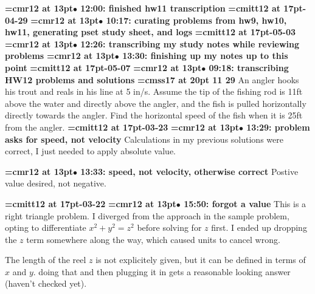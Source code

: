 {\smallskip\noindent\bf\font\titlefont=cmr12 at 13pt\titlefont $\bullet$ 12:00: finished hw11 transcription}\smallskip
{\medskip\noindent\bf\font\titlefont=cmitt12 at 17pt-04-29}\medskip
{\smallskip\noindent\bf\font\titlefont=cmr12 at 13pt\titlefont $\bullet$ 10:17: curating problems from hw9, hw10, hw11, generating pset study sheet, and logs}\smallskip
{\medskip\noindent\bf\font\titlefont=cmitt12 at 17pt-05-03}\medskip
{\smallskip\noindent\bf\font\titlefont=cmr12 at 13pt\titlefont $\bullet$ 12:26: transcribing my study notes while reviewing problems}\smallskip
{\smallskip\noindent\bf\font\titlefont=cmr12 at 13pt\titlefont $\bullet$ 13:30: finishing up my notes up to this point}\smallskip
{\medskip\noindent\bf\font\titlefont=cmitt12 at 17pt-05-07}\medskip
{\smallskip\noindent\bf\font\titlefont=cmr12 at 13pt\titlefont $\bullet$ 09:18: transcribing HW12 problems and solutions}\smallskip
{}
{\medskip\noindent\bf\font\titlefont=cmss17 at 20pt 11 29}\medskip
An angler hooks his trout and reals in his line at 5 in/s.
Assume the tip of the fishing rod is 11ft above the water
and directly above the angler, and the fish is pulled horizontally
directly towards the angler. Find the horizontal speed of the fish
when it is 25ft from the angler.
{\medskip\noindent\bf\font\titlefont=cmitt12 at 17pt-03-23}\medskip
{\smallskip\noindent\bf\font\titlefont=cmr12 at 13pt\titlefont $\bullet$ 13:29: problem asks for speed, not velocity}\smallskip
Calculations in my previous solutions were correct, I just needed to apply absolute value.
\par

{\smallskip\noindent\bf\font\titlefont=cmr12 at 13pt\titlefont $\bullet$ 13:33: speed, not velocity, otherwise correct}\smallskip
Postive value desired, not negative.
\par

{\medskip\noindent\bf\font\titlefont=cmitt12 at 17pt-03-22}\medskip
{\smallskip\noindent\bf\font\titlefont=cmr12 at 13pt\titlefont $\bullet$ 15:50: forgot a value}\smallskip
This is a right triangle problem. I diverged from the approach in the sample problem, opting to differentiate $x^2 + y^2 = z^2$ before solving for $z$ first. I ended up dropping the $z$ term somewhere along the way, which caused units to cancel wrong.
\par

The length of the reel $z$ is not explicitely given, but it can be defined in terms of $x$ and $y$. doing that and then plugging it in gets a reasonable looking answer (haven't checked yet).
\par

